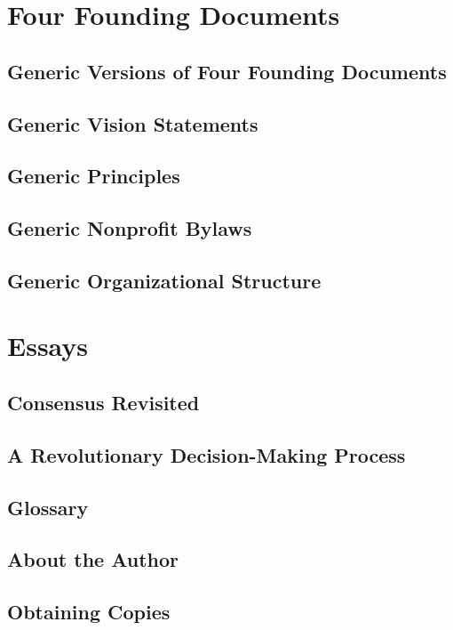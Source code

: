 \documentclass[12pt,nottoc]{book}
\begin{document}
\part{Four Founding Documents}
\setcounter{chapter}{0}
%
\chapter*{Generic Versions of Four Founding Documents}


\chapter[Vision Statement]{Generic Vision Statements}


\chapter[Principles]{Generic Principles}


\chapter[Bylaws]{Generic Nonprofit Bylaws}


\chapter[\index{structure}Structure]{Generic Organizational Structure}



\part{Essays}
\setcounter{chapter}{0}
\chapter{Consensus Revisited} %
\label{cha:consensus_revisited}


\chapter[Revolutionary Process]{A Revolutionary Decision-Making Process}


\backmatter

\chapter{Glossary}




\nocite{*}



\printindex

\chapter{About the Author}


\chapter*{Obtaining Copies}
{\footnotesize
\pagestyle{plain}


}
\end{document}
